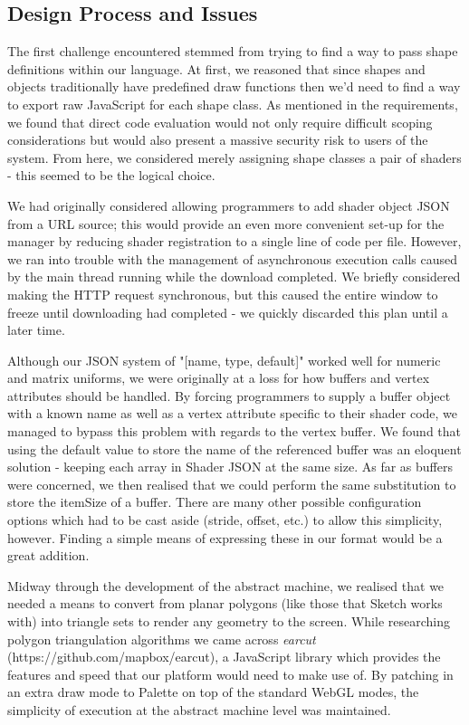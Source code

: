 \documentclass{l3proj}
\begin{document}
\subsection{Design Process and Issues}
\label{arch-shad-design}
The first challenge encountered stemmed from trying to find a way to pass shape definitions within our language. At first, we reasoned that since shapes and objects traditionally have predefined draw functions then we'd need to find a way to export raw JavaScript for each shape class. As mentioned in the requirements, we found that direct code evaluation would not only require difficult scoping considerations but would also present a massive security risk to users of the system. From here, we considered merely assigning shape classes a pair of shaders - this seemed to be the logical choice.

We had originally considered allowing programmers to add shader object JSON from a URL source; this would provide an even more convenient set-up for the manager by reducing shader registration to a single line of code per file. However, we ran into trouble with the management of asynchronous execution calls caused by the main thread running while the download completed. We briefly considered making the HTTP request synchronous, but this caused the entire window to freeze until downloading had completed - we quickly discarded this plan until a later time.

Although our JSON system of "[name, type, default]" worked well for numeric and matrix uniforms, we were originally at a loss for how buffers and vertex attributes should be handled. By forcing programmers to supply a buffer object with a known name as well as a vertex attribute specific to their shader code, we managed to bypass this problem with regards to the vertex buffer. We found that using the default value to store the name of the referenced buffer was an eloquent solution - keeping each array in Shader JSON at the same size. As far as buffers were concerned, we then realised that we could perform the same substitution to store the itemSize of a buffer. There are many other possible configuration options which had to be cast aside (stride, offset, etc.) to allow this simplicity, however. Finding a simple means of expressing these in our format would be a great addition.

Midway through the development of the abstract machine, we realised that we needed a means to convert from planar polygons (like those that Sketch works with) into triangle sets to render any geometry to the screen. While researching polygon triangulation algorithms we came across \textit{earcut} (https://github.com/mapbox/earcut), a JavaScript library which provides the features and speed that our platform would need to make use of. By patching in an extra draw mode to Palette on top of the standard WebGL modes, the simplicity of execution at the abstract machine level was maintained.
\end{document}
